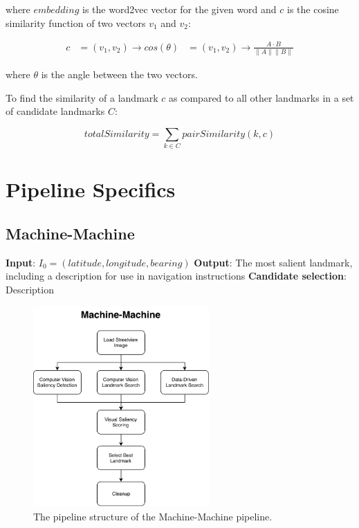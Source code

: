 where $embedding$ is the word2vec vector for the given word and $c$ is the cosine similarity function of two vectors $v_1$ and $v_2$:

\begin{align}\label{eq:cosineSimilarity}
    c &= (v_1, v_2) \longrightarrow cos(\theta)
      &= (v_1, v_2) \longrightarrow \frac{A \cdot B}{\parallel A \parallel \parallel B \parallel}
\end{align}

where $\theta$ is the angle between the two vectors.

To find the similarity of a landmark $c$ as compared to all other landmarks in a set of candidate landmarks $C$:

\begin{equation}\label{eq:landmrkSimilarityOverall}
    totalSimilarity = \sum\limits_{k \in C} pairSimilarity(k, c)
\end{equation}

\section{Pipeline Specifics}
\subsection{Machine-Machine}

\textbf{Input}: $I_0 = (latitude, longitude, bearing)$
\textbf{Output}: The most salient landmark, including a description for use in navigation instructions
\textbf{Candidate selection}: Description

\begin{figure}[htbp]
  \centering
  \includegraphics[width=0.6\textwidth]{pipeline_diagrams/machine-machine.pdf}
  \caption{The pipeline structure of the Machine-Machine pipeline.}
  \label{fig:pipeline:mm}
\end{figure}

